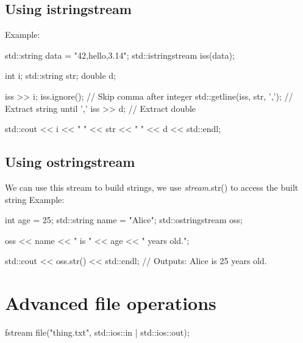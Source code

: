 \documentclass{report}
\begin{document}
     \bigbreak \noindent 
     \subsection{Using istringstream}
     \bigbreak \noindent 
     Example:
     \bigbreak \noindent 
     
     \begin{cppcode}
std::string data = "42,hello,3.14";
std::istringstream iss(data);

int i;
std::string str;
double d;

iss >> i;
iss.ignore(); // Skip comma after integer
std::getline(iss, str, ','); // Extract string until ','
iss >> d;                    // Extract double

std::cout << i << " " << str << " " << d << std::endl;
     \end{cppcode}
     

     \bigbreak \noindent 
     \subsection{Using ostringstream}
     \bigbreak \noindent 
     We can use this stream to build strings, we use \textit{stream}.str() to access the built string
     \bigbreak \noindent 
     Example:
     \bigbreak \noindent 
     
     \begin{cppcode}
int age = 25;
std::string name = "Alice";
std::ostringstream oss;

oss << name << " is " << age << " years old.";

std::cout << oss.str() << std::endl; // Outputs: Alice is 25 years old.
     \end{cppcode}
     

    \pagebreak \bigbreak \noindent 
    \section{\LARGE Advanced file operations}
    \bigbreak \noindent 
    \begin{cppcode}
fstream file("thing.txt", std::ios::in | std::ios::out);
    \end{cppcode}

    \pagebreak \bigbreak \noindent 
\end{document}
